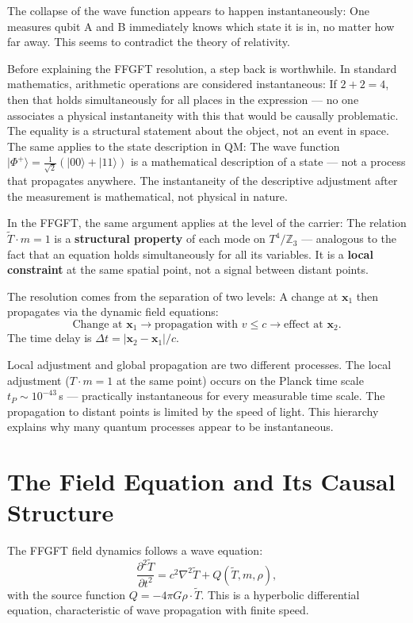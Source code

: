 The collapse of the wave function appears to happen instantaneously: One measures
qubit A and B immediately knows which state it is in, no matter how far
away. This seems to contradict the theory of relativity.

Before explaining the FFGFT resolution, a step back is worthwhile. In
standard mathematics, arithmetic operations are considered instantaneous: If
$2 + 2 = 4$, then that holds simultaneously for all places in the expression
--- no one associates a physical instantaneity with this that would be causally problematic. The equality is a structural
statement about the object, not an event in space. The same applies
to the state description in QM: The wave function
$|\Phi^+\rangle = \frac{1}{\sqrt2}(|00\rangle+|11\rangle)$ is a
mathematical description of a state --- not a process that propagates
anywhere. The instantaneity of the descriptive adjustment after
the measurement is mathematical, not physical in nature.

In the FFGFT, the same argument applies at the level of the carrier: The
relation $\tilde T\cdot m = 1$ is a \textbf{structural
property} of each mode on $T^4/\mathbb{Z}_3$ --- analogous to the fact that
an equation holds simultaneously for all its variables. It is a
\textbf{local constraint} at the same spatial point, not a
signal between distant points.

The resolution comes from the separation of two levels: A change at $\mathbf{x}_1$ then propagates via
the dynamic field equations:
\begin{equation}
  \text{Change at }\mathbf{x}_1
  \to \text{propagation with }v\le c
  \to \text{effect at }\mathbf{x}_2.
\end{equation}
The time delay is $\Delta t = |\mathbf{x}_2-\mathbf{x}_1|/c$.

Local adjustment and global propagation are two different processes.
The local adjustment ($T\cdot m = 1$ at the same point) occurs on the
Planck time scale $t_P\sim10^{-43}$\,s --- practically instantaneous for every
measurable time scale. The propagation to distant points is limited by the
speed of light. This hierarchy explains why many
quantum processes appear to be instantaneous.

\section{The Field Equation and Its Causal Structure}

The FFGFT field dynamics follows a wave equation:
\begin{equation}
  \frac{\partial^2\tilde T}{\partial t^2} = c^2\nabla^2\tilde T + Q(\tilde T,m,\rho),
\end{equation}
with the source function $Q = -4\pi G\rho\cdot\tilde T$. This is a
hyperbolic differential equation, characteristic of
wave propagation with finite speed.

